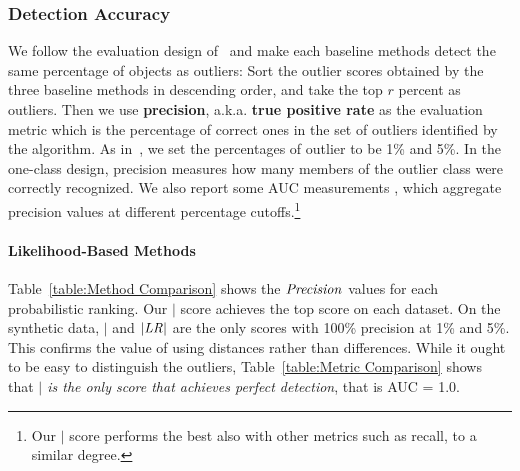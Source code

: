 \documentclass[conference]{IEEEtran}
\begin{document}
						\subsubsection{Detection Accuracy} We follow the evaluation design of~\cite{Gao2010} and 
	make each baseline methods detect the same percentage of  objects as outliers:
					Sort the outlier scores obtained by the three baseline methods in descending order, and take the top $r$ percent as outliers. Then we use \textbf{precision}, a.k.a. \textbf{true positive rate} as the evaluation metric which is the percentage of correct ones in the set of outliers identified by the algorithm. As in~\cite{Gao2010}, we set the percentages of outlier to be 1\% and 5\%. In the one-class design, precision measures how many members of the outlier class were correctly recognized. We also report some AUC measurements \cite{aggarwal2013}, which aggregate precision values at different percentage cutoffs.\footnote{Our $\mid$ score performs the best also with other metrics such as recall, to a similar degree.} %

						
						\paragraph{Likelihood-Based Methods} 
						
						
						Table~\ref{table:Method Comparison} shows the $\it{Precision}$ values for each probabilistic ranking. Our $\mid$ score achieves the top score on each dataset. On the synthetic data, $\mid$ and $|\it{LR}|$ are the only scores with 100\% precision at 1\% and 5\%. This confirms the value of using distances rather than differences. 
						While it ought to be easy to distinguish the outliers, Table~\ref{table:Metric Comparison} shows that {\em $\mid$  is the only score that achieves perfect detection}, that is AUC = 1.0.
						
\end{document}
